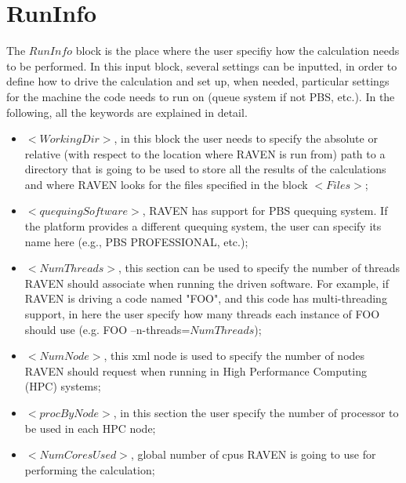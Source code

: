 \section{RunInfo  \\ \vspace{2 mm} {\small }}
The $RunInfo$ block is the place where the user specifiy how the calculation needs to be performed. In this input block, several settings can be inputted, in order to define how to drive the calculation and set up, when needed, particular settings for the machine the code needs to run on (queue system if not PBS, etc.).
In the following, all the keywords are explained in detail.
\begin{itemize}
\item $<WorkingDir>$, in this block the user needs to specify the absolute or relative (with respect to the location where RAVEN is run from) path to a directory that is going to be used to store all the results of the calculations and where RAVEN looks for the files specified in the block $<Files>$;
\item $<quequingSoftware>$, RAVEN has support for PBS quequing system. If the platform provides a different quequing system, the user can specify its name here (e.g., PBS PROFESSIONAL, etc.);
\item $<NumThreads>$, this section can be used to specify the number of threads RAVEN should associate when running the driven software. For example, if RAVEN is driving a code named "FOO", and this code has multi-threading support, in here the user specify how many threads each instance of FOO should use (e.g. FOO --n-threads=$NumThreads$);
\item $<NumNode>$, this xml node is used to specify the number of nodes RAVEN should request when running in High Performance Computing (HPC) systems;
\item $<procByNode>$, in this section the user specify the number of processor to be used in each HPC node;
\item $<NumCoresUsed>$, global number of cpus RAVEN is going to use for performing the calculation;

\end{itemize}

